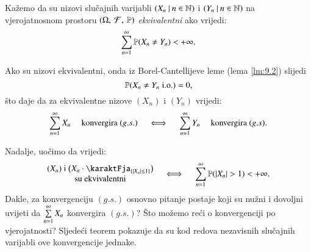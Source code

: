 \begin{defn}    \label{defn:13.6}
    Ka\v zemo da su nizovi slu\v cajnih varijabli $({X_n} \: | \: {n \in \mathbb{N}})$ i $({Y_n} \: | \: {n \in \mathbb{N}})$ na vjerojatnosnom prostoru $(\Omega, \: \mathcal{F}, \: \mathbb{P})$ \emph{ekvivalentni} ako vrijedi:
    \begin{equation*}
        \sum\limits_{n = 1}^{\infty} \mathbb{P}({X_n \neq Y_n}) < +\infty.
    \end{equation*}
\end{defn}

Ako su nizovi ekvivalentni, onda iz Borel-Cantellijeve leme (lema \ref{lm:9.2}) slijedi
\begin{equation*}
    \mathbb{P}({X_n \neq Y_n \; \mathrm{i.o.}}) = 0,
\end{equation*}
\v sto daje da za ekvivalentne nizove $(X_n)$ i $(Y_n)$ vrijedi:
\begin{equation}    \label{jed:13.7}
    \sum\limits_{n = 1}^{\infty} X_n \quad \textnormal{ konvergira } (g.s.) \quad \iff \quad \sum\limits_{n = 1}^{\infty} Y_n \quad \textnormal{ konvergira } (g.s).
\end{equation}

Nadalje, uo\v cimo da vrijedi:
\begin{equation}    \label{jed:13.8}
    \begin{matrix}
        (X_n) \textnormal{ i } \big(X_n \cdot \karaktFja_{\{ |X_n| \leq 1 \}}\big)\\
        \textnormal{su ekvivalentni}
    \end{matrix}
    \quad \iff \quad
    \suma{n = 1}{\infty} \vjeroj{|X_n|>1} < +\infty.
\end{equation}
Dakle, za konvergenciju $(g.s.)$ osnovno pitanje postaje koji su nu\v zni i dovoljni uvijeti da $\sum\limits_{n = 1}^{\infty} X_n$ konvergira $(g.s.)$?
\v Sto mo\v zemo re\' ci o konvergenciji po vjerojatnosti?
Sljede\' ci teorem pokazuje da su kod redova nezavisnih slu\v cajnih varijabli ove konvergencije jednake.

